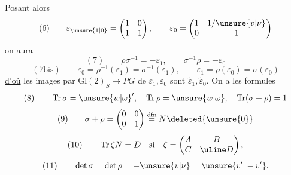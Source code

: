 Posant alors
\[
(6)\qquad \varepsilon_{\unsure{1|0}}=\begin{pmatrix}1&0\\1&1\end{pmatrix},\qquad \varepsilon_0=\begin{pmatrix}1&1/\unsure{v|\nu}\\0&1\end{pmatrix}
\]
on aura
\[
(7)\qquad \rho\sigma^{-1}=-\varepsilon_1,\qquad\sigma^{-1}\rho=-\varepsilon_0
\]
\[
(7\mathrm{bis})\qquad \varepsilon_0=\rho^{-1}(\varepsilon_1)=\sigma^{-1}(\varepsilon_1),\qquad\varepsilon_1=\rho(\varepsilon_0)=\sigma(\varepsilon_0)
\]
\uline{d'où} les images par $\mathrm{Gl}(2)_S\longrightarrow PG$ de  $\varepsilon_1,\varepsilon_0$ sont $\widetilde\varepsilon_1,\widetilde\varepsilon_0$. On a les formules
\[
(8)\qquad \operatorname{Tr}\sigma=\unsure{w|\omega}',\quad\operatorname{Tr}\rho=\unsure{w|\omega},\quad\operatorname{Tr}(\sigma+\rho)=1
\]
\[
(9)\qquad \sigma+\rho=\begin{pmatrix}0&0\\0&1\end{pmatrix}\overset{\mathrm{dfn}}=N\deleted{\unsure{0}}
\]
\[
(10)\qquad \operatorname{Tr}\zeta N=D\quad\text{si}\quad\zeta=\begin{pmatrix}A&B\\C&\uline D\end{pmatrix},
\]
\[
(11)\qquad \det\sigma=\det\rho=-\unsure{v|\nu}=\unsure{v'|-v'}.
\]


